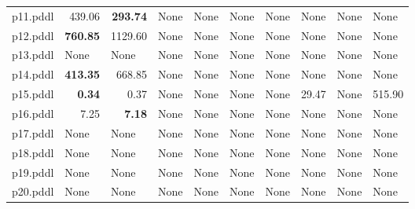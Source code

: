 \documentclass{article}
\begin{document}
\begin{tabular}{@{}lrrrrrrrrr@{}}
p11.pddl & 439.06 & \textbf{293.74} & \multicolumn{1}{|l|}{None} & \multicolumn{1}{|l|}{None} & \multicolumn{1}{|l|}{None} & \multicolumn{1}{|l|}{None} & \multicolumn{1}{|l|}{None} & \multicolumn{1}{|l|}{None} & \multicolumn{1}{|l|}{None} \\
p12.pddl & \textbf{760.85} & 1129.60 & \multicolumn{1}{|l|}{None} & \multicolumn{1}{|l|}{None} & \multicolumn{1}{|l|}{None} & \multicolumn{1}{|l|}{None} & \multicolumn{1}{|l|}{None} & \multicolumn{1}{|l|}{None} & \multicolumn{1}{|l|}{None} \\
p13.pddl & \multicolumn{1}{|l|}{None} & \multicolumn{1}{|l|}{None} & \multicolumn{1}{|l|}{None} & \multicolumn{1}{|l|}{None} & \multicolumn{1}{|l|}{None} & \multicolumn{1}{|l|}{None} & \multicolumn{1}{|l|}{None} & \multicolumn{1}{|l|}{None} & \multicolumn{1}{|l|}{None} \\
p14.pddl & \textbf{413.35} & 668.85 & \multicolumn{1}{|l|}{None} & \multicolumn{1}{|l|}{None} & \multicolumn{1}{|l|}{None} & \multicolumn{1}{|l|}{None} & \multicolumn{1}{|l|}{None} & \multicolumn{1}{|l|}{None} & \multicolumn{1}{|l|}{None} \\
p15.pddl & \textbf{0.34} & 0.37 & \multicolumn{1}{|l|}{None} & \multicolumn{1}{|l|}{None} & \multicolumn{1}{|l|}{None} & \multicolumn{1}{|l|}{None} & 29.47 & \multicolumn{1}{|l|}{None} & 515.90 \\
p16.pddl & 7.25 & \textbf{7.18} & \multicolumn{1}{|l|}{None} & \multicolumn{1}{|l|}{None} & \multicolumn{1}{|l|}{None} & \multicolumn{1}{|l|}{None} & \multicolumn{1}{|l|}{None} & \multicolumn{1}{|l|}{None} & \multicolumn{1}{|l|}{None} \\
p17.pddl & \multicolumn{1}{|l|}{None} & \multicolumn{1}{|l|}{None} & \multicolumn{1}{|l|}{None} & \multicolumn{1}{|l|}{None} & \multicolumn{1}{|l|}{None} & \multicolumn{1}{|l|}{None} & \multicolumn{1}{|l|}{None} & \multicolumn{1}{|l|}{None} & \multicolumn{1}{|l|}{None} \\
p18.pddl & \multicolumn{1}{|l|}{None} & \multicolumn{1}{|l|}{None} & \multicolumn{1}{|l|}{None} & \multicolumn{1}{|l|}{None} & \multicolumn{1}{|l|}{None} & \multicolumn{1}{|l|}{None} & \multicolumn{1}{|l|}{None} & \multicolumn{1}{|l|}{None} & \multicolumn{1}{|l|}{None} \\
p19.pddl & \multicolumn{1}{|l|}{None} & \multicolumn{1}{|l|}{None} & \multicolumn{1}{|l|}{None} & \multicolumn{1}{|l|}{None} & \multicolumn{1}{|l|}{None} & \multicolumn{1}{|l|}{None} & \multicolumn{1}{|l|}{None} & \multicolumn{1}{|l|}{None} & \multicolumn{1}{|l|}{None} \\
p20.pddl & \multicolumn{1}{|l|}{None} & \multicolumn{1}{|l|}{None} & \multicolumn{1}{|l|}{None} & \multicolumn{1}{|l|}{None} & \multicolumn{1}{|l|}{None} & \multicolumn{1}{|l|}{None} & \multicolumn{1}{|l|}{None} & \multicolumn{1}{|l|}{None} & \multicolumn{1}{|l|}{None} \\
\end{tabular}
\end{document}
